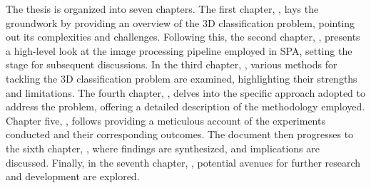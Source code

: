 \documentclass[../main.tex]{subfiles}
\begin{document}
The thesis is organized into seven chapters. The first chapter, , lays the groundwork by providing an overview of the 3D classification problem, pointing out its complexities and challenges. Following this, the second chapter, , presents a high-level look at the image processing pipeline employed in SPA, setting the stage for subsequent discussions. In the third chapter, , various methods for tackling the 3D classification problem are examined, highlighting their strengths and limitations. The fourth chapter, , delves into the specific approach adopted to address the problem, offering a detailed description of the methodology employed. Chapter five, , follows providing a meticulous account of the experiments conducted and their corresponding outcomes. The document then progresses to the sixth chapter, , where findings are synthesized, and implications are discussed. Finally, in the seventh chapter, , potential avenues for further research and development are explored.
\end{document}
